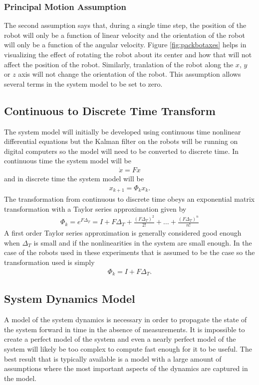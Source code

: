 \subsubsection{Principal Motion Assumption}
\label{sec:kfPrincipalMotionAssumption}
The second assumption says that, during a single time step, the position of the robot will only be a function of linear velocity and the orientation of the robot will only be a function of the angular velocity. Figure \ref{fig:packbotaxes} helps in visualizing the effect of rotating the robot about its center and how that will not affect the position of the robot. Similarly, tranlation of the robot along the $x$, $y$ or $z$ axis will not change the orientation of the robot. This assumption allows several terms in the system model to be set to zero.

\subsection{Continuous to Discrete Time Transform}
\label{sec:kfContToDiscTransform}
The system model will initially be developed using continuous time nonlinear differential equations but the Kalman filter on the robots will be running on digital computers so the model will need to be converted to discrete time. In continuous time the system model will be
\begin{align*}
\dot{x} = Fx
\end{align*}
and in discrete time the system model will be
\begin{align*}
x_{k+1} = \Phi_k x_k.
\end{align*}
The transformation from continuous to discrete time obeys an exponential matrix transformation with a Taylor series approximation \cite{Gelb74} given by
\begin{align*}
\Phi_k = e^{F\Delta_T} = I + F\Delta_T + \frac{(F\Delta_T)^2}{2!} + \ldots + \frac{(F\Delta_T)^n}{n!}
\end{align*}
A first order Taylor series approximation is generally considered good enough when $\Delta_T$ is small and if the nonlinearities in the system are small enough. In the case of the robots used in these experiments that is assumed to be the case so the transformation used is simply
\begin{align}
\label{eq:kfContToDiscTransform}
\Phi_k = I + F\Delta_T.
\end{align}

\subsection{System Dynamics Model}
\label{sec:dynamics}
A model of the system dynamics is necessary in order to propagate the state of the system forward in time in the absence of measurements. It is impossible to create a perfect model of the system and even a nearly perfect model of the system will likely be too complex to compute fast enough for it to be useful. The best result that is typically available is a model with a large amount of assumptions where the most important aspects of the dynamics are captured in the model.

